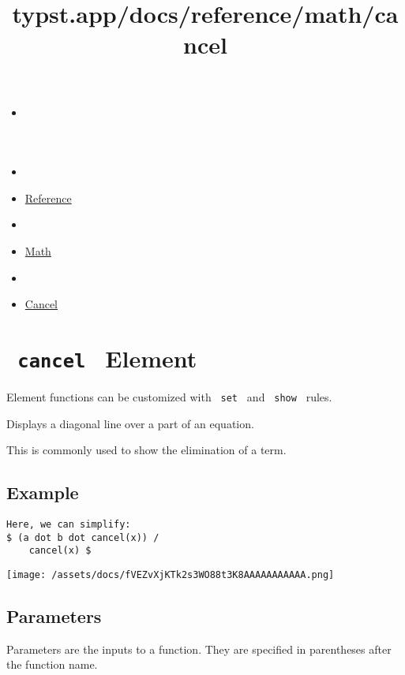 \title{typst.app/docs/reference/math/cancel}

\begin{itemize}
\tightlist
\item
  \href{/docs}{}
\item
  
\item
  \href{/docs/reference/}{Reference}
\item
  
\item
  \href{/docs/reference/math/}{Math}
\item
  
\item
  \href{/docs/reference/math/cancel/}{Cancel}
\end{itemize}

\section{\texorpdfstring{\texttt{\ cancel\ } {{ Element
}}}{ cancel   Element }}\label{summary}

\label{element-tooltip}
Element functions can be customized with \texttt{\ set\ } and
\texttt{\ show\ } rules.

Displays a diagonal line over a part of an equation.

This is commonly used to show the elimination of a term.

\subsection{Example}\label{example}

\begin{verbatim}
Here, we can simplify:
$ (a dot b dot cancel(x)) /
    cancel(x) $
\end{verbatim}

\texttt{[image: /assets/docs/fVEZvXjKTk2s3WO88t3K8AAAAAAAAAAA.png]}

\subsection{\texorpdfstring{{ Parameters
}}{ Parameters }}\label{parameters}

\label{parameters-tooltip}
Parameters are the inputs to a function. They are specified in
parentheses after the function name.

